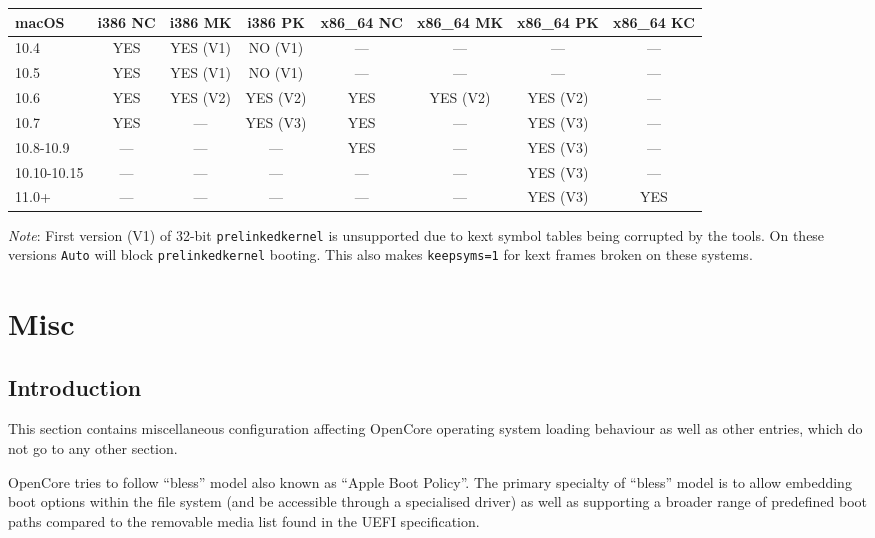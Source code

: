 \documentclass[]{article}
\begin{document}
\begin{enumerate}
  \begin{center}
  \begin{tabular}{|p{0.67in}|c|c|c|c|c|c|c|}
  \hline
  \textbf{macOS} & \textbf{i386 NC} & \textbf{i386 MK} & \textbf{i386 PK} & \textbf{x86\_64 NC} & \textbf{x86\_64 MK} & \textbf{x86\_64 PK} & \textbf{x86\_64 KC} \\
  \hline
  10.4 & YES & YES (V1) & NO (V1) & --- & --- & --- & --- \\
  \hline
  10.5 & YES & YES (V1) & NO (V1) & --- & --- & --- & --- \\
  \hline
  10.6 & YES & YES (V2) & YES (V2) & YES & YES (V2) & YES (V2) & --- \\
  \hline
  10.7 & YES & --- & YES (V3) & YES & --- & YES (V3) & --- \\
  \hline
  10.8-10.9 & --- & --- & --- & YES & --- & YES (V3) & --- \\
  \hline
  10.10-10.15 & --- & --- & --- & --- & --- & YES (V3) & --- \\
  \hline
  11.0+ & --- & --- & --- & --- & --- & YES (V3) & YES \\
  \hline
  \end{tabular}
  \end{center}

  \emph{Note}: First version (V1) of 32-bit \texttt{prelinkedkernel} is unsupported
  due to kext symbol tables being corrupted by the tools. On these versions \texttt{Auto}
  will block \texttt{prelinkedkernel} booting. This also makes \texttt{keepsyms=1} for kext frames
  broken on these systems.

\end{enumerate}


\section{Misc}\label{misc}

\subsection{Introduction}\label{miscintro}

This section contains miscellaneous configuration affecting OpenCore operating system loading behaviour
as well as other entries, which do not go to any other section.

OpenCore tries to follow ``bless'' model also known as ``Apple Boot Policy''. The primary specialty of
``bless'' model is to allow embedding boot options within the file system (and be accessible through a
specialised driver) as well as supporting a broader range of predefined boot paths compared to the
removable media list found in the UEFI specification.
\end{document}

